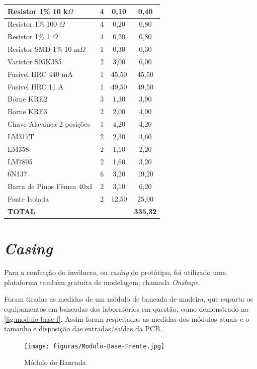 \begin{table}[h!]
\begin{tabular}{ l c c c }
Resistor 1\% 10 k$\Omega$ & 4 & 0,10 & 0,40 \\ \hline
Resistor 1\% 100 $\Omega$ & 4 & 0,20 & 0,80 \\ \hline
Resistor 1\% 1 $\Omega$ & 4 & 0,20 & 0,80 \\ \hline
Resistor SMD 1\% 10 m$\Omega$ & 1 & 0,30 & 0,30 \\ \hline
Varistor S05K385 & 2 & 3,00 & 6,00 \\ \hline
Fusível HRC 440 mA & 1 & 45,50 & 45,50 \\ \hline
Fusível HRC 11 A & 1 & 49,50 & 49,50 \\ \hline
Borne KRE2 & 3 & 1,30 & 3,90 \\ \hline
Borne KRE3 & 2 & 2,00 & 4,00 \\ \hline
Chave Alavanca 2 posições & 1 & 4,20 & 4,20 \\ \hline
LM317T & 2 & 2,30 & 4,60 \\ \hline
LM358 & 2 & 1,10 & 2,20 \\ \hline
LM7805 & 2 & 1,60 & 3,20 \\ \hline
6N137 & 6 & 3,20 & 19,20 \\ \hline
Barra de Pinos Fêmea 40x1 & 2 & 3,10 & 6,20 \\ \hline
Fonte Isolada & 2 & 12,50 & 25,00 \\ \hline
\textbf{TOTAL} &  &  & \textbf{335,32} \\ \hline
\end{tabular}
\fonte{}
\end{table}


\section{\textit{Casing}}\label{Casing}

Para a confecção do invólucro, ou \textit{casing} do protótipo, foi utilizado uma plataforma também gratuita de modelagem, chamada \textit{Onshape}.

Foram tiradas as medidas de um módulo de bancada de madeira, que suporta os equipamentos em bancadas dos laboratórios em questão, como demonstrado na \autoref{fig:modulo-base-f}. Assim foram respeitadas as medidas dos módulos atuais e o tamanho e disposição das entradas/saídas da \gls{PCB}.

\begin{figure}[htb!]
    \caption{Módulo de Bancada}
    \label{fig:modulo-base-f}
    \texttt{[image: figuras/Modulo-Base-Frente.jpg]}
    \fonte{}
\end{figure}

